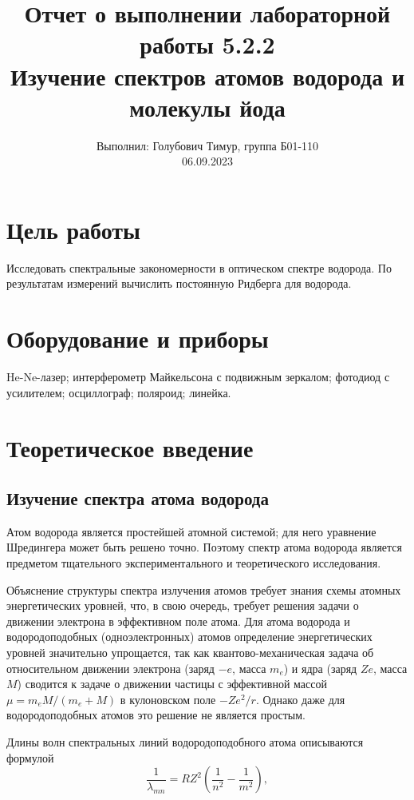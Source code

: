 \documentclass[12pt,a4paper]{article}
\author{\normalsize Выполнил: Голубович Тимур, группа Б01-110 \\
    	\normalsize 06.09.2023}
\date{}
\title{
    	\large Отчет о выполнении лабораторной работы 5.2.2 \\
    	\Large Изучение спектров атомов водорода и молекулы йода
     }
\begin{document}
    	\maketitle
    	
    \section*{Цель работы}
    Исследовать спектральные закономерности в оптическом спектре водорода. По результатам измерений вычислить постоянную Ридберга для водорода.
    
    \section*{Оборудование и приборы} 
    He-Ne-лазер; интерферометр Майкельсона с подвижным зеркалом; фотодиод с усилителем; осциллограф; поляроид; линейка.

	
    \section*{Теоретическое введение}

    \subsection*{Изучение спектра атома водорода}

	Атом водорода является простейшей атомной системой; для него уравнение Шредингера может быть решено точно. Поэтому спектр атома водорода является предметом тщательного экспериментального и теоретического исследования.
	
	Объяснение структуры спектра излучения атомов требует знания схемы атомных энергетических уровней, что, в свою очередь, требует решения задачи о движении электрона в эффективном поле атома. Для атома водорода и водородоподобных (одноэлектронных) атомов определение энергетических уровней значительно упрощается, так как квантово-механическая задача об относительном движении электрона (заряд $-e$, масса $m_e$) и ядра (заряд $Ze$, масса $M$) сводится к задаче о движении частицы с эффективной массой $\mu = m_e M/(m_e + M)$ в кулоновском поле $-Ze^2/r$. Однако даже для водородоподобных атомов это решение не является простым.

	
	Длины волн спектральных линий водородоподобного атома описываются формулой
	\begin{equation}
		\frac{1}{\lambda_{mn}} = RZ^2\left(\frac{1}{n^2} - \frac{1}{m^2}\right),
	\end{equation}
	
\end{document}

